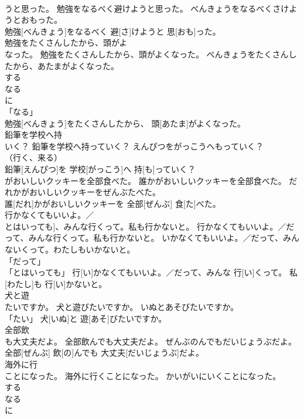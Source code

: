 \documentclass[8pt]{extreport}
\begin{document}
\begin{CJK}{UTF8}{min}
\\	うと思った。	勉強をなるべく避けようと思った。	べんきょうをなるべくさけようとおもった。	
\\	勉強[べんきょう]をなるべく 避[さ]けようと 思[おも]った。		
\\	勉強をたくさんしたから、頭がよ
\\	なった。	勉強をたくさんしたから、頭がよくなった。	べんきょうをたくさんしたから、あたまがよくなった。	
\\	する 
\\	なる 
\\	に 
\\	「なる」 
\\	勉強[べんきょう]をたくさんしたから、 頭[あたま]がよくなった。		
\\	鉛筆を学校へ持
\\	いく？	鉛筆を学校へ持っていく？	えんぴつをがっこうへもっていく？	
\\	（行く、来る） 
\\	鉛筆[えんぴつ]を 学校[がっこう]へ 持[も]っていく？		
\\	がおいしいクッキーを全部食べた。	誰かがおいしいクッキーを全部食べた。	だれかがおいしいクッキーをぜんぶたべた。	
\\	誰[だれ]かがおいしいクッキーを 全部[ぜんぶ] 食[た]べた。		
\\	行かなくてもいいよ。／
\\	とはいっても]、みんな行くって。私も行かないと。	行かなくてもいいよ。／だって、みんな行くって。私も行かないと。	いかなくてもいいよ。／だって、みんないくって。わたしもいかないと。	
\\	「だって」 
\\	「とはいっても」	行[い]かなくてもいいよ。／だって、みんな 行[い]くって。 私[わたし]も 行[い]かないと。		
\\	犬と遊
\\	たいですか。	犬と遊びたいですか。	いぬとあそびたいですか。	
\\	「たい」	犬[いぬ]と 遊[あそ]びたいですか。		
\\	全部飲
\\	も大丈夫だよ。	全部飲んでも大丈夫だよ。	ぜんぶのんでもだいじょうぶだよ。	
\\	全部[ぜんぶ] 飲[の]んでも 大丈夫[だいじょうぶ]だよ。		
\\	海外に行
\\	ことになった。	海外に行くことになった。	かいがいにいくことになった。	
\\	する 
\\	なる 
\\	に 

\end{CJK}
\end{document}
